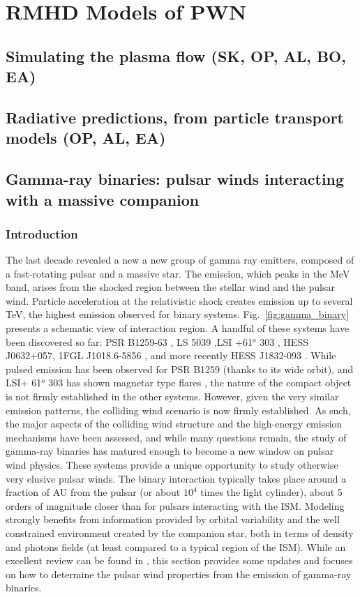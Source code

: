 \section{RMHD Models of PWN}
\subsection{Simulating the plasma flow         (SK, OP, AL, BO, EA)}
\subsection{Radiative predictions, from particle transport models      (OP, AL, EA)}
\subsection{Gamma-ray binaries: pulsar winds interacting with a massive companion}
\subsubsection{Introduction}
The last decade revealed a new  a new group of gamma ray emitters, composed of a fast-rotating pulsar and a massive star. The emission, which peaks in the MeV band, arises from the shocked region between the stellar wind and the pulsar wind. Particle acceleration at the relativistic shock creates emission up to several TeV, the highest emission observed for binary systems. Fig.~\ref{fig:gamma_binary} presents a schematic view of interaction region. A handful of these systems have been discovered so far: PSR B1259-63 \citep{2005A&A...442....1A}, LS 5039 \citep{2005Sci...309..746A} ,LSI +61$^o$ 303 \citep{2006Sci...312.1771A}, HESS J0632+057\citep{2011ApJ...737L..11B}, 1FGL J1018.6-5856 \citep{2010ApJS..188..405A}, and more recently HESS J1832-093 \citep{2016MNRAS.457.1753E}. While pulsed emission has been observed for PSR B1259 (thanks to its wide orbit), and LSI+ 61$^o$ 303 has shown magnetar type flares \citet{ATEL}, the nature of the compact object is not firmly established in the other systems. However, given the very similar emission patterns, the colliding wind scenario is now firmly established. As such, the major aspects of the colliding wind structure and the high-energy emission mechanisms have been assessed, and while many questions remain, the study of  gamma-ray binaries has matured enough to become a new window on pulsar wind physics.  These systems provide a unique opportunity to study otherwise very elusive pulsar winds. The binary interaction typically takes place around a fraction of  AU from the pulsar (or about $10^4$ times the light cylinder), about 5 orders of magnitude closer than for pulsars interacting with the ISM.  Modeling strongly benefits from information provided by orbital variability and  the well constrained environment created by the companion star, both in terms of density and photons fields (at least compared to a typical region of the ISM).  While an excellent review can be found in \citet{2013A&ARv..21...64D}, this section provides some updates and focuses on how to determine the pulsar wind properties from the emission of gamma-ray binaries.



